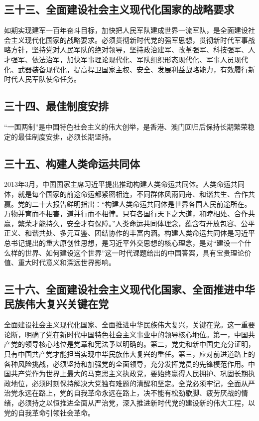 \documentclass[UTF8,11pt,a4paper]{ctexart}
\begin{document}
\subsection*{三十三、全面建设社会主义现代化国家的战略要求}

如期实现建军一百年奋斗目标，加快把人民军队建成世界一流军队，是全面建设社会主义现代化国家的战略要求。必须贯彻新时代党的强军思想，贯彻新时代军事战略方针，坚持党对人民军队的绝对领导，坚持政治建军、改革强军、科技强军、人才强军、依法治军，加快军事理论现代化、军队组织形态现代化、军事人员现代化、武器装备现代化，提高捍卫国家主权、安全、发展利益战略能力，有效履行新时代人民军队使命任务。

\subsection*{三十四、最佳制度安排}

“一国两制”是中国特色社会主义的伟大创举，是香港、澳门回归后保持长期繁荣稳定的最佳制度安排，必须长期坚持。

\subsection*{三十五、构建人类命运共同体}

2013年3月，中国国家主席习近平提出推动构建人类命运共同体。人类命运共同体，就是每个国家的前途命运都紧密相连，不同群体风雨同舟、和谐共生、合作共赢。党的二十大报告鲜明指出：“构建人类命运共同体是世界各国人民前途所在。万物并育而不相害，道并行而不相悖。只有各国行天下之大道，和睦相处、合作共赢，繁荣才能持久，安全才有保障。”人类命运共同体理念，蕴含有开放包容、公平正义、和谐共处、多元互鉴、团结协作的丰富内涵。构建人类命运共同体是习近平总书记提出的重大原创性思想，是习近平外交思想的核心理念，是对“建设一个什么样的世界、如何建设这个世界”这一时代课题给出的中国答案，具有宝贵理论价值、重大时代意义和深远世界影响。

\subsection*{三十六、全面建设社会主义现代化国家、全面推进中华民族伟大复兴关键在党}

全面建设社会主义现代化国家、全面推进中华民族伟大复兴，关键在党。这一重要论断，明确了党在新时代中国特色社会主义事业中的领导核心地位。第一，中国共产党的领导核心地位是党章和宪法予以明确的。第二，党史和新中国史充分证明，只有中国共产党才能担当实现中华民族伟大复兴的重任。第三，应对前进道路上的各种风险挑战，必须坚持和加强党的全面领导，充分发挥党员的先锋模范作用。中国共产党作为世界上最大的马克思主义执政党，要始终赢得人民拥护、巩固长期执政地位，必须时刻保持解决大党独有难题的清醒和坚定。全党必须牢记，全面从严治党永远在路上，党的自我革命永远在路上，决不能有松劲歇脚、疲劳厌战的情绪，必须持之以恒推进全面从严治党，深入推进新时代党的建设新的伟大工程，以党的自我革命引领社会革命。
\end{document}
